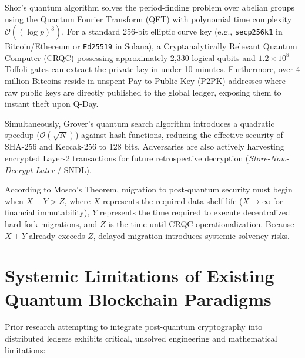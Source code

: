 \documentclass[runningheads]{llncs}
\begin{document}
Shor's quantum algorithm solves the period-finding problem over abelian groups using the Quantum Fourier Transform (QFT) with polynomial time complexity $\mathcal{O}((\log p)^3)$. For a standard 256-bit elliptic curve key (e.g., \texttt{secp256k1} in Bitcoin/Ethereum or \texttt{Ed25519} in Solana), a Cryptanalytically Relevant Quantum Computer (CRQC) possessing approximately 2,330 logical qubits and $1.2 \times 10^8$ Toffoli gates can extract the private key in under 10 minutes. Furthermore, over 4 million Bitcoins reside in unspent Pay-to-Public-Key (P2PK) addresses where raw public keys are directly published to the global ledger, exposing them to instant theft upon Q-Day.

Simultaneously, Grover's quantum search algorithm introduces a quadratic speedup ($\mathcal{O}(\sqrt{N})$) against hash functions, reducing the effective security of SHA-256 and Keccak-256 to 128 bits. Adversaries are also actively harvesting encrypted Layer-2 transactions for future retrospective decryption (\textit{Store-Now-Decrypt-Later} / SNDL).

According to Mosco's Theorem, migration to post-quantum security must begin when $X + Y > Z$, where $X$ represents the required data shelf-life ($X \to \infty$ for financial immutability), $Y$ represents the time required to execute decentralized hard-fork migrations, and $Z$ is the time until CRQC operationalization. Because $X + Y$ already exceeds $Z$, delayed migration introduces systemic solvency risks.

\section{Systemic Limitations of Existing Quantum Blockchain Paradigms}
Prior research attempting to integrate post-quantum cryptography into distributed ledgers exhibits critical, unsolved engineering and mathematical limitations:
\end{document}
